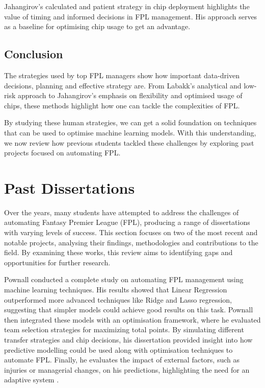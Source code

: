 Jahangirov's calculated and patient strategy in chip deployment highlights the value of timing and informed decisions in FPL management. His approach serves as a baseline for optimising chip usage to get an advantage.

\subsection{Conclusion}

The strategies used by top FPL managers show how important data-driven decisions, planning and effective strategy are. From Labakk’s analytical and low-risk approach to Jahangirov’s emphasis on flexibility and optimised usage of chips, these methods highlight how one can tackle the complexities of FPL.

By studying these human strategies, we can get a solid foundation on techniques that can be used to optimise machine learning models. With this understanding, we now review how previous students tackled these challenges by exploring past projects focused on automating FPL.

\section{Past Dissertations}

Over the years, many students have attempted to address the challenges of automating Fantasy Premier League (FPL), producing a range of dissertations with varying levels of success. This section focuses on two of the most recent and notable projects, analysing their findings, methodologies and contributions to the field. By examining these works, this review aims to identifying gaps and opportunities for further research.

Pownall conducted a complete study on automating FPL management using machine learning techniques. His results showed that Linear Regression outperformed more advanced techniques like Ridge and Lasso regression, suggesting that simpler models could achieve good results on this task. Pownall then integrated these models with an optimisation framework, where he evaluated team selection strategies for maximizing total points. By simulating different transfer strategies and chip decisions, his dissertation provided insight into how predictive modelling could be used along with optimisation techniques to automate FPL. Finally, he evaluates the impact of external factors, such as injuries or managerial changes, on his predictions, highlighting the need for an adaptive system \cite{pownall2023fantasyfootball}.

